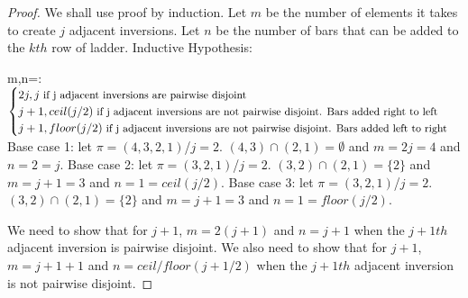 \begin{proof}
    We shall use proof by induction. Let $m$ be the number of elements it takes to create $j$ adjacent inversions.
    Let $n$ be the number of bars that can be added to the $kth$ row of ladder.
    Inductive Hypothesis:\newline

    m,n=:$\begin{cases}
            2j,j \small{\mbox{ if j adjacent inversions are pairwise disjoint}}\\
            j+1,ceil(j/2) \small{\mbox{ if j adjacent inversions are not pairwise disjoint.  Bars added right to left}}\\
            j+1,floor(j/2) \small{\mbox{ if j adjacent inversions are not pairwise disjoint. Bars added left to right}}\\
        \end{cases}$\\



    Base case 1: let $\pi=(4,3,2,1)$/$j=2$. $(4,3) \cap (2,1) = \emptyset$ and $m=2j=4$ and $n=2=j$. \newline 
    Base case 2: let $\pi=(3,2,1)$/$j=2$. $(3,2) \cap (2,1)= \{2\}$ and $m=j+1=3$ and $n=1=ceil(j/2)$.\newline
    Base case 3: let $\pi=(3,2,1)$/$j=2$. $(3,2) \cap (2,1)= \{2\}$ and $m=j+1=3$ and $n=1=floor(j/2)$.\newline



    We need to show that for $j+1$, $m=2(j+1)$ and $n=j+1$ when the $j+1th$ adjacent inversion is pairwise disjoint.
    We also need to show that for $j+1$, $m=j+1+1$ and $n=ceil/floor(j+1/2)$ when the $j+1th$ adjacent inversion is not pairwise 
    disjoint.\par




\end{proof}
